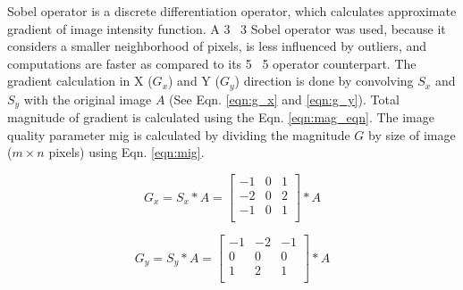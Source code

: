            \vspace{5mm}
            \noindent Sobel operator is a discrete differentiation operator, which calculates approximate gradient of image intensity function. A 3 \times\ 3 Sobel operator was used, because it considers a smaller neighborhood of pixels, is less influenced by outliers, and computations are faster as compared to its 5 \times\ 5 operator counterpart. The gradient calculation in X ($G_x$) and Y ($G_y$) direction is done by convolving $S_x$ and $S_y$ with the original image $A$ (See Eqn. \ref{eqn:g_x} and \ref{eqn:g_y}). Total magnitude of gradient is calculated using the Eqn. \ref{eqn:mag_eqn}. The image quality parameter \gls{mig} is calculated by dividing the magnitude $G$ by size of image (\( m \times n\) pixels) using Eqn. \ref{eqn:mig}. 
            

            \begin{equation}
                G_x = S_x * A = 
                \begin{bmatrix}
                    -1 & 0 & 1 \\
                    -2 & 0 & 2 \\
                    -1 & 0 & 1 \\
                \end{bmatrix} * A
                \label{eqn:g_x}
            \end{equation}

            \begin{equation}
                G_y = S_y * A = 
                \begin{bmatrix}
                    -1 & -2 & -1 \\
                    0 & 0 & 0 \\
                    1 & 2 & 1 \\
                \end{bmatrix} * A
                \label{eqn:g_y}
            \end{equation}

